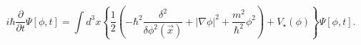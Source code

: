 \begin{equation}
i\hbar\frac{\partial}{\partial t}\Psi\left[  \phi,t\right]  =\int
d^{3}x\left\{  \frac{1}{2}\left(  -\hbar^{2}\frac{\delta^{2}}{\delta\phi
^{2}\left(  \vec{x}\right)  }+\left|  \nabla\phi\right|  ^{2}+\frac{m^{2}%
}{\hbar^{2}}\phi^{2}\right)  +V_{\star}\left(  \phi\right)  \right\}
\Psi\left[  \phi,t\right]  .\label{18}%
\end{equation}

